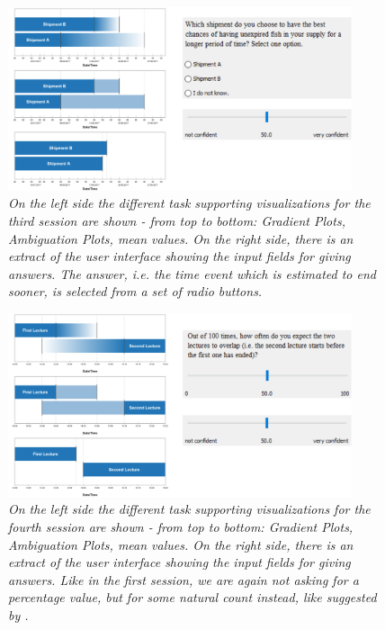\begin{figure}[H]
	\centering
	\includegraphics[width=0.9\textwidth]{figures/EvalBench_session3.png}
	\caption{\textit{On the left side the different task supporting visualizations for the third session are shown - from top to bottom: Gradient Plots, Ambiguation Plots, mean values. On the right side, there is an extract of the user interface showing the input fields for giving answers. The answer, i.e. the time event which is estimated to end sooner, is selected from a set of radio buttons.}}
	\label{fig:EvalBench_session3}
\end{figure}

\begin{figure}[H]
	\centering
	\includegraphics[width=0.9\textwidth]{figures/EvalBench_session4.png}
	\caption{\textit{On the left side the different task supporting visualizations for the fourth session are shown - from top to bottom: Gradient Plots, Ambiguation Plots, mean values. On the right side, there is an extract of the user interface showing the input fields for giving answers. Like in the first session, we are again not asking for a percentage value, but for some natural count instead, like suggested by \citet{hullman2016evaluating}.}}
	\label{fig:EvalBench_session4}
\end{figure}


